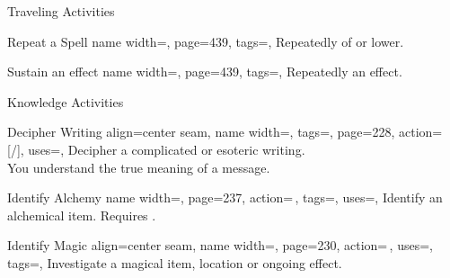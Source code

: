 \begin{PageFront}
\begin{Tables}{\frontTableHeight}
\begin{Table}{Traveling Activities}
\begin{entry}{Repeat a Spell}{%
                name width=\activityLength,%
                page=439,
                tags=\Concentrate,
            }
                Repeatedly  of or lower.\hfill
            \end{entry}
            \begin{entry}{Sustain an effect}{%
                name width=\activityLength,%
                page=439,
                tags=\Concentrate,
            }
                Repeatedly  an effect. \hfill
            \end{entry}
        \end{Table}
        \TableSpace
        \begin{Table}{Knowledge Activities}
            \begin{entry}{Decipher Writing}{%
                align=center seam,
                name width=\activityLength,%
                tags=\Concentrate,
                page=228,
                action=\,[/],
                uses={\VariousKnowledge[tags={T,S}]},
            }
                Decipher a complicated or esoteric writing. \hfill
                \\
                You understand the true meaning of a   message. \hfill
            \end{entry}
            \begin{entry}{Identify Alchemy}{%
                name width=\activityLength,%
                page=237,
                action=\,,
                tags=\Concentrate,
                uses={\Crafting[tags={T,S}]},
            }
                Identify an alchemical item. Requires .\hfill
            \end{entry}
            \begin{entry}{Identify Magic}{%
                align=center seam,
                name width=\activityLength,%
                page=230,
                action=\,,
                uses={\MagicalSkill[tags={T,S}]},
                tags=\Concentrate,
            }
                Investigate a magical item, location or ongoing effect.\hfill
                \quad
                \\

\end{entry}
\end{Table}
\end{Tables}
\end{PageFront}
